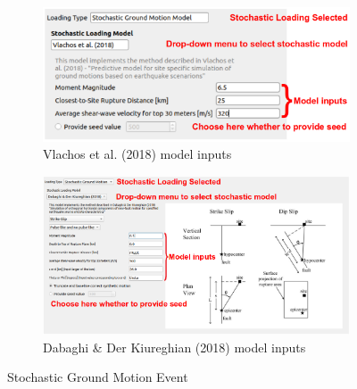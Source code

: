 \begin{figure}[!htbp]
  \centering
    \begin{subfigure}{\textwidth}
        \centering
        \includegraphics[width=\textwidth]{usage/figures/stochastic_loading.png}
        \caption{Vlachos et al. (2018) model inputs}
    \end{subfigure}
    \hspace*{\fill}
    
    \begin{subfigure}{\textwidth}
        \centering
        \includegraphics[width=\textwidth]{usage/figures/stochastic_dabaghi.png}
        \caption{Dabaghi \& Der Kiureghian (2018) model inputs}
        \label{fig:dabaghi}        
    \end{subfigure}
    
  \caption{Stochastic Ground Motion Event}
  \label{fig:stochastic_loading}    
\end{figure}
